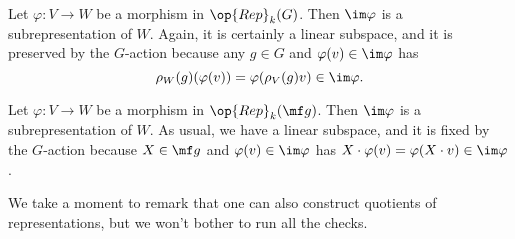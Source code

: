 \documentclass[../notes.tex]{subfiles}
\begin{document}
\begin{example} \label{ex:image-subrep}
	Let $\varphi\colon V\to W$ be a morphism in $\op{Rep}_k(G)$. Then $\im\varphi$ is a subrepresentation of $W$. Again, it is certainly a linear subspace, and it is preserved by the $G$-action because any $g\in G$ and $\varphi(v)\in\im\varphi$ has
	\[\rho_W(g)(\varphi(v))=\varphi(\rho_V(g)v)\in\im\varphi.\]
\end{example}
\begin{example} \label{ex:image-subrep-alg}
	Let $\varphi\colon V\to W$ be a morphism in $\op{Rep}_k(\mf g)$. Then $\im\varphi$ is a subrepresentation of $W$. As usual, we have a linear subspace, and it is fixed by the $G$-action because $X\in\mf g$ and $\varphi(v)\in\im\varphi$ has $X\cdot\varphi(v)=\varphi(X\cdot v)\in\im\varphi$.
\end{example}
We take a moment to remark that one can also construct quotients of representations, but we won't bother to run all the checks.
\end{document}
